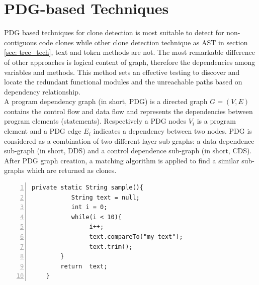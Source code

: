 \documentclass{report}
\begin{document}
\section{PDG-based Techniques}
\label{sec: pdg_tech}
PDG based techniques for clone detection is most suitable to detect for non-contiguous code clones while other clone detection technique as AST in section \ref{sec: tree_tech}, text and token methods are not. The most remarkable difference of other approaches is logical content of graph, therefore the dependencies among variables and methods. This method sets an effective testing to discover and locate the redundant functional modules and the unreachable paths based on dependency relationship.
\\
A program dependency graph (in short, PDG) is a directed graph $ G = (V, E)$ contains the control flow and data flow and represents the dependencies between program elements (statements). Respectively a PDG nodes $V_{i}$ is a program element and a PDG edge $E_{i}$ indicates a dependency between two nodes. PDG is considered as a combination of two different layer sub-graphs: a data dependence sub-graph (in short, DDS) and a control dependence sub-graph (in short, CDS).
After PDG graph creation, a matching algorithm is applied to find a similar sub-graphs which are returned as clones.

\begin{lstlisting}[numbers=left, numbersep=-5pt]
    private static String sample(){
 		   String text = null;	
		   int i = 0;
		   while(i < 10){
				i++;
				text.compareTo("my text");
				text.trim();
		}
		return  text;
	} 
\end{lstlisting}
\end{document}
